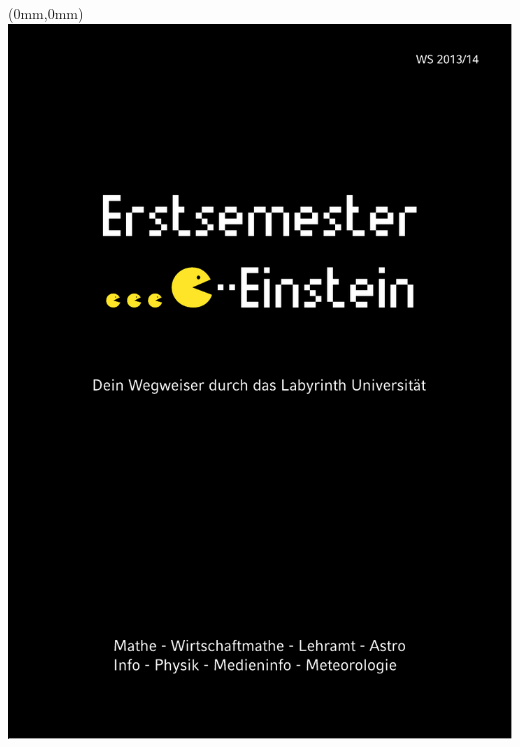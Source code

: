 \documentclass[twoside,a5paper,fontsize=9pt]{scrartcl}
\begin{document}
\begin{titlepage}
\thispagestyle{empty}
\begin{textblock*}{\paperwidth}(0mm,0mm)
   \noindent\includegraphics[width=\paperwidth,height=\paperheight]{titel}
\end{textblock*}
\mbox{}
\end{titlepage}

\newpage


\setcounter{page}{1}

\vspace*{0.02cm}
\tableofcontents
\clearpage

\def\mail#1{\url{#1}}
















\end{document}

